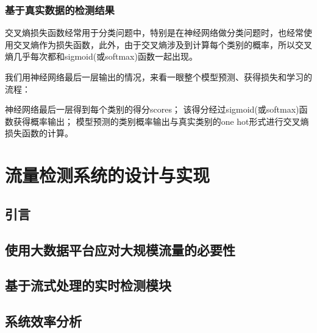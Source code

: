 
\subsection{基于真实数据的检测结果}
交叉熵损失函数经常用于分类问题中，特别是在神经网络做分类问题时，也经常使用交叉熵作为损失函数，此外，由于交叉熵涉及到计算每个类别的概率，所以交叉熵几乎每次都和sigmoid(或softmax)函数一起出现。

我们用神经网络最后一层输出的情况，来看一眼整个模型预测、获得损失和学习的流程：

神经网络最后一层得到每个类别的得分scores；
该得分经过sigmoid(或softmax)函数获得概率输出；
模型预测的类别概率输出与真实类别的one hot形式进行交叉熵损失函数的计算。

\chapter{流量检测系统的设计与实现}

\section{引言}

\section{使用大数据平台应对大规模流量的必要性}

\section{基于流式处理的实时检测模块}

\section{系统效率分析}

